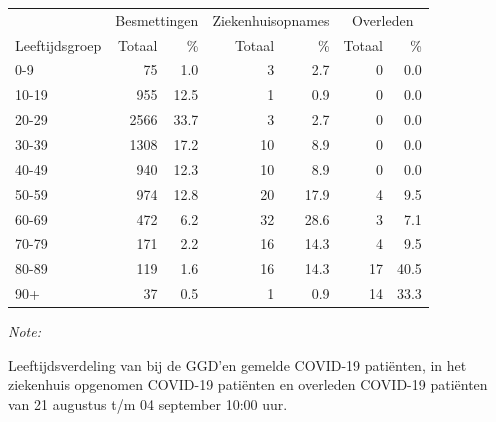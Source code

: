 \documentclass[
  english,
  man,floatsintext]{apa6}
\begin{document}
\begin{table}[H]
\centering\begingroup\fontsize{11}{13}\selectfont

\begin{threeparttable}
\begin{tabular}{lrrrrrr}
\toprule
\multicolumn{1}{c}{ } & \multicolumn{2}{c}{Besmettingen} & \multicolumn{2}{c}{Ziekenhuisopnames} & \multicolumn{2}{c}{Overleden} \\
\cmidrule(l{3pt}r{3pt}){2-3} \cmidrule(l{3pt}r{3pt}){4-5} \cmidrule(l{3pt}r{3pt}){6-7}
Leeftijdsgroep & Totaal & \% & Totaal & \% & Totaal & \%\\
\midrule
0-9 & 75 & 1.0 & 3 & 2.7 & 0 & 0.0\\
10-19 & 955 & 12.5 & 1 & 0.9 & 0 & 0.0\\
20-29 & 2566 & 33.7 & 3 & 2.7 & 0 & 0.0\\
30-39 & 1308 & 17.2 & 10 & 8.9 & 0 & 0.0\\
40-49 & 940 & 12.3 & 10 & 8.9 & 0 & 0.0\\
50-59 & 974 & 12.8 & 20 & 17.9 & 4 & 9.5\\
60-69 & 472 & 6.2 & 32 & 28.6 & 3 & 7.1\\
70-79 & 171 & 2.2 & 16 & 14.3 & 4 & 9.5\\
80-89 & 119 & 1.6 & 16 & 14.3 & 17 & 40.5\\
90+ & 37 & 0.5 & 1 & 0.9 & 14 & 33.3\\
\bottomrule
\end{tabular}
\begin{tablenotes}
\item \textit{Note: } 
\item Leeftijdsverdeling van bij de GGD’en gemelde COVID-19 patiënten, in het ziekenhuis opgenomen COVID-19 patiënten en overleden COVID-19 patiënten van 21 augustus t/m 04 september 10:00 uur.
\end{tablenotes}
\end{threeparttable}
\endgroup{}
\end{table}
\end{document}
